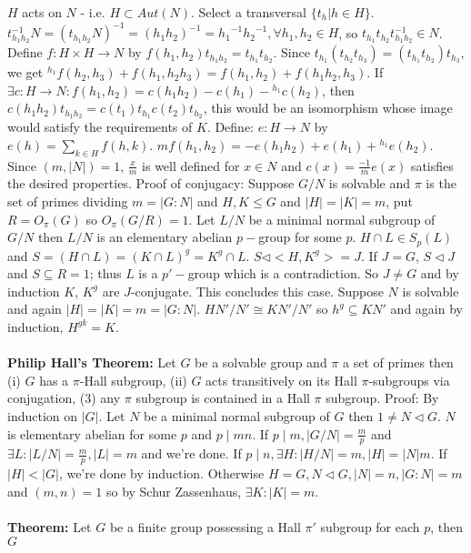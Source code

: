 $H$ acts on $N$ - i.e. $H \subset Aut(N)$.
Select a transversal $\{t_h | h \in H \}$.
$ t^{-1}_{h_1h_2}N = (t_{h_1h_2}N)^{-1}=
(h_1h_2)^{-1}= {h_1}^{-1}{h_2}^{-1}, \forall h_1 , h_2 \in H$, so 
$t_{h_1}t_{h_2} t^{-1}_{h_1 h_2} \in N$.  Define $f: H \times H \rightarrow N$ by
$f(h_1, h_2) t_{h_1 h_2} = t_{h_1} t_{h_2}$.  Since
$t_{h_1}(t_{h_2} t_{h_3}) = (t_{h_1}t_{h_2}) t_{h_3}$, we get
$ {^{h_1}} f(h_2, h_3)+ f(h_1, h_2 h_3)= f(h_1, h_2)+ f(h_1 h_2 , h_3)$.  If 
$\exists c:H \rightarrow N: f(h_1 , h_2)= c(h_1 h_2) -c(h_1) - {^{h_1}} c(h_2)$, then
$c(h_1 h_2) t_{h_1 h_2}= c(t_1)t_{h_1} c(t_2) t_{h_2}$, this would be an isomorphism
whose image would satisfy the requirements of $K$.  Define: $e: H \rightarrow N$ by
$e(h) = \sum_{k \in H} f(h , k)$.
$m f( h_1 , h_2 )=  -e(h_1 h_2) + e(h_1) + {^{h_1}}e(h_2)$.  Since $(m, |N|)=1$,
${\frac x m}$ is well defined for $ x \in N$ and $c(x)= {\frac {-1} m} e(x)$ satisfies the
desired properties.
Proof of conjugacy:
Suppose $G/N$ is solvable and $\pi$ is the set of primes dividing $m=|G:N|$ and
$H,K \le G$ and $|H|=|K|=m$, put $R=O_{\pi}(G)$ so $O_{\pi}(G/R) = 1$.  
Let $L/N$ be a minimal
normal subgroup of $G/N$ then $L/N$ is an elementary abelian $p-$group for some $p$.
$H\cap L \in S_p(L)$ and
$S=(H \cap L)=(K \cap L)^g= K^g \cap L$.  $S \lhd <H, K^g>=J$.  If $J=G$, $S \lhd J$
and $S \subseteq R=1$; thus $L$ is a $p'-$group which is a contradiction.  So
$J \ne G$ and by induction $K$, $K^g$ are $J$-conjugate.  
This concludes this case.  Suppose
$N$ is solvable and again $|H|=|K|=m=|G:N|$.  
$HN'/N' \cong KN'/N'$ so $h^g \subseteq KN'$ and
again by induction, $H^{gk}= K$.\\
\\
{\bf Philip Hall's Theorem:} 
Let $G$ be a solvable group and $\pi$ a set of primes then (i) $G$ has a $\pi$-Hall
subgroup, (ii) $G$ acts transitively on its Hall $\pi$-subgroups via conjugation, 
(3) any $\pi$ subgroup is contained in a Hall $\pi$ subgroup.
Proof: By induction on $|G|$.  Let $N$ be a minimal normal subgroup of $G$ then
$1 \ne N \lhd G$.  $N$ is elementary abelian for some $p$ and $p \mid mn$.   If
$p \mid m, |G/N|= {\frac m p}$ and $\exists L: |L/N|= {\frac m p}, |L|= m$ and we're done.
If $p \mid n, \exists H: |H/N|=m, |H|= |N|m$.  If $|H| < |G|$, we're done by induction.
Otherwise $H=G, N \lhd G, |N|= n, |G:N|=m$ and $(m,n)=1$ so by Schur Zassenhaus,
$\exists K: |K|=m$.\\
\\
{\bf Theorem: } Let $G$ be a finite group possessing a Hall $\pi'$ subgroup for each $p$, then $G$ 
